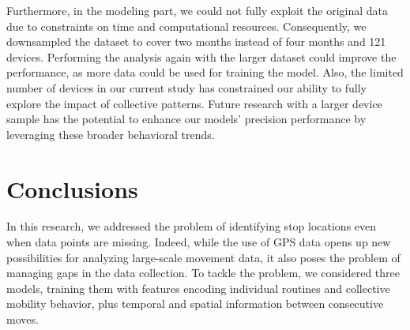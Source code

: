 \documentclass{article}
\begin{document}
Furthermore, in the modeling part, we could not fully exploit the original data due to constraints on time and computational resources. Consequently, we downsampled the dataset to cover two months instead of four months and 121 devices. Performing the analysis again with the larger dataset could improve the performance, as more data could be used for training the model.
Also, the limited number of devices in our current study has constrained our ability to fully explore the impact of collective patterns. Future research with a larger device sample has the potential to enhance our models' precision performance by leveraging these broader behavioral trends.

\section{Conclusions}
In this research, we addressed the problem of identifying stop locations even when data points are missing. Indeed, while the use of GPS data opens up new possibilities for analyzing large-scale movement data, it also poses the problem of managing gaps in the data collection. To tackle the problem, we considered three models, training them with features encoding individual routines and collective mobility behavior, plus temporal and spatial information between consecutive moves. 
\end{document}
